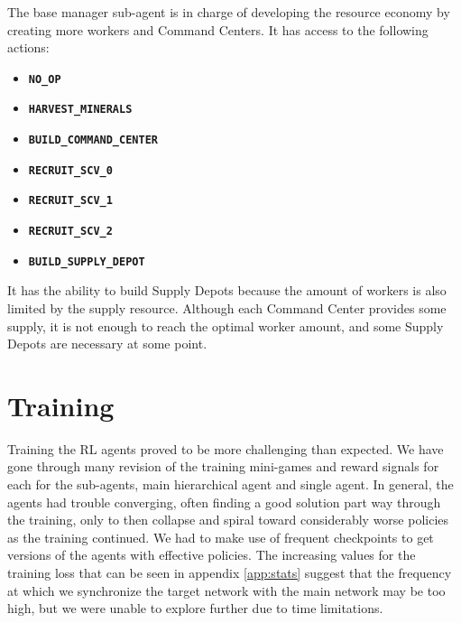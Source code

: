 The base manager sub-agent is in charge of developing the resource economy by creating more workers and Command Centers. It has access to the following actions:

\begin{multicols}{2}
\begin{itemize}
    \item \textbf{\texttt{NO\_OP}}
    \item \textbf{\texttt{HARVEST\_MINERALS}}
    \item \textbf{\texttt{BUILD\_COMMAND\_CENTER}}
    \item \textbf{\texttt{RECRUIT\_SCV\_0}}
    \item \textbf{\texttt{RECRUIT\_SCV\_1}}
    \item \textbf{\texttt{RECRUIT\_SCV\_2}}
    \item \textbf{\texttt{BUILD\_SUPPLY\_DEPOT}}
\end{itemize}
\end{multicols}

It has the ability to build Supply Depots because the amount of workers is also limited by the supply resource. Although each Command Center provides some supply, it is not enough to reach the optimal worker amount, and some Supply Depots are necessary at some point.

\section{Training}
\label{sec:training}

Training the RL agents proved to be more challenging than expected. We have gone through many revision of the training mini-games and reward signals for each for the sub-agents, main hierarchical agent and single agent. In general, the agents had trouble converging, often finding a good solution part way through the training, only to then collapse and spiral toward considerably worse policies as the training continued. We had to make use of frequent checkpoints to get versions of the agents with effective policies. The increasing values for the training loss that can be seen in appendix \ref{app:stats} suggest that the frequency at which we synchronize the target network with the main network may be too high, but we were unable to explore further due to time limitations.

